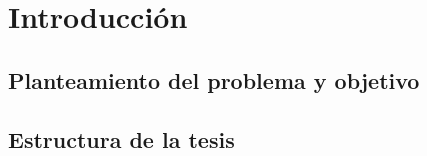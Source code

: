 \chapter{Introducción}\label{ch:introduccion}

\section{Planteamiento del problema y objetivo}

\section{Estructura de la tesis}